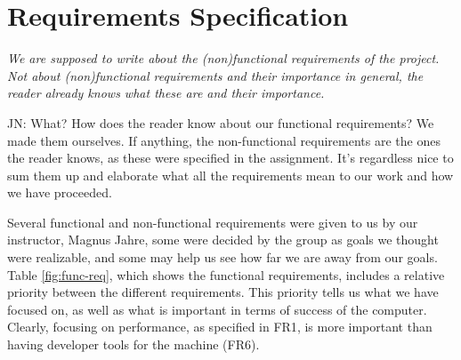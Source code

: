 \section{Requirements Specification}
{\em \color{Maroon} We are supposed to write about the (non)functional
  requirements of the project. Not about (non)functional requirements and their
  importance in general, the reader already knows what these are and their
  importance.

 JN: What? How does the reader know about our functional requirements? We made
 them ourselves. If anything, the non-functional requirements are the ones the
 reader knows, as these were specified in the assignment. It's regardless nice
 to sum them up and elaborate what all the requirements mean to our work and how
 we have proceeded.}

% 


% 


 Several functional
and non-functional requirements were given to us by our instructor, Magnus
Jahre, some were decided by the group as goals we thought were realizable, and
some may help us see how far we are away from our goals. Table
\ref{fig:func-req}, which shows the functional requirements, includes a relative
priority between the different requirements.  This priority tells us what we
have focused on, as well as what is important in terms of success of the
computer. Clearly, focusing on performance, as specified in {\sc FR1}, is more
important than having developer tools for the machine ({\sc FR6}).

